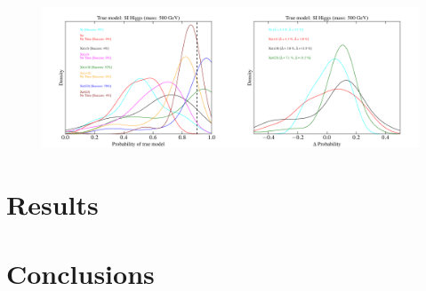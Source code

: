 \documentclass[11pt]{article}
\begin{document}
\begin{figure}
\includegraphics[width=0.5\textwidth]{plots/PDF_500GeV_SI_Higgs_50sims_Xe_Xe3x_Xe10x_XeG3_TNT_noGF.pdf}\includegraphics[width=0.5\textwidth]{plots/PDF_500GeV_SI_Higgs_50sims_Xe_Xe3x_Xe10x_XeG3_noGF_TimeDIFF.pdf}
\caption{\label{fig:500gev_si_XeFull_tnt_noGF}}
\end{figure}




\section{Results}

\section{Conclusions}





\end{document}
